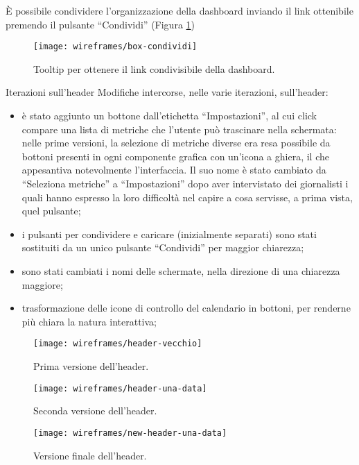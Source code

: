 \documentclass[../../../main.tex]{subfiles}
\begin{document}
\`E possibile condividere l'organizzazione della dashboard inviando il link ottenibile premendo il pulsante ``Condividi'' (Figura \ref{fig:box-condividi})
\begin{figure}[H]
    \centering
    \texttt{[image: wireframes/box-condividi]}
    \caption{Tooltip per ottenere il link condivisibile della dashboard.}\label{fig:box-condividi}
\end{figure}


\begin{bclogo}{Iterazioni sull'header}
Modifiche intercorse, nelle varie iterazioni, sull'header:
\begin{itemize}
    \item è stato aggiunto un bottone dall'etichetta ``Impostazioni'', al cui click compare una lista di metriche che l'utente può trascinare nella schermata: nelle prime versioni, la selezione di metriche diverse era resa possibile da bottoni presenti in ogni componente grafica con un'icona a ghiera, il che appesantiva notevolmente l'interfaccia. Il suo nome è stato cambiato da ``Seleziona metriche'' a ``Impostazioni'' dopo aver intervistato dei giornalisti i quali hanno espresso la loro difficoltà nel capire a cosa servisse, a prima vista, quel pulsante;
    \item i pulsanti per condividere e caricare (inizialmente separati) sono stati sostituiti da un unico pulsante ``Condividi'' per maggior chiarezza;
    \item sono stati cambiati i nomi delle schermate, nella direzione di una chiarezza maggiore;
    \item trasformazione delle icone di controllo del calendario in bottoni, per renderne più chiara la natura interattiva;
\end{itemize}
\begin{figure}[H]
    \centering
    \texttt{[image: wireframes/header-vecchio]}
    \caption{Prima versione dell'header.}\label{fig:header-vecchio}
\end{figure}
\begin{figure}[H]
    \centering
    \texttt{[image: wireframes/header-una-data]}
    \caption{Seconda versione dell'header.}\label{fig:header-finale}
\end{figure}
\begin{figure}[H]
    \centering
    \texttt{[image: wireframes/new-header-una-data]}
    \caption{Versione finale dell'header.}\label{fig:new-header-finale}
\end{figure}
\end{bclogo}
\end{document}
